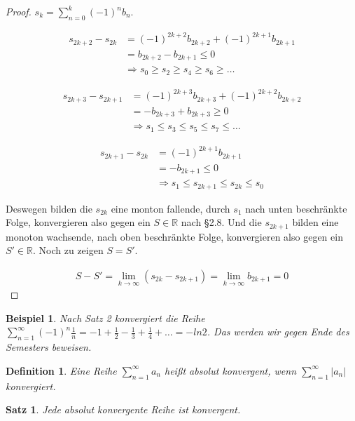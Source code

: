 \documentclass[a4paper,10pt]{article}
\newtheorem{definition}{Definition}
\newtheorem{example}{Beispiel}
\newtheorem{satz}{Satz}
\begin{document}
\begin{proof}
 $s_k = \sum_{n = 0}^k (-1)^n b_n$.
 
 \begin{align*}
  s_{2k + 2} - s_{2k} & = (-1)^{2k + 2} b_{2k + 2} + (-1)^{2k + 1} b_{2k + 1}\\
  & = b_{2k + 2} - b_{2k + 1} \le 0\\
  & \Rightarrow s_0 \ge s_2 \ge s_4 \ge s_6 \ge \dots
 \end{align*}
 
 \begin{align*}
  s_{2k + 3} - s_{2k + 1} & = (-1)^{2k + 3} b_{2k + 3} + (-1)^{2k + 2} b_{2k + 2}\\
  & = -b_{2k + 3} + b_{2k + 3} \ge 0\\
  & \Rightarrow s_1 \le s_3 \le s_5 \le s_7 \le \dots
 \end{align*}
 
 \begin{align*}
  s_{2k + 1} - s_{2k} & = (-1)^{2k + 1} b_{2k + 1}\\
  & = -b_{2k + 1} \le 0\\
  & \Rightarrow s_1 \le s_{2k + 1} \le s_{2k} \le s_0
 \end{align*}
 
 Deswegen bilden die $s_{2k}$ eine monton fallende, durch $s_1$ nach unten beschränkte Folge, konvergieren also gegen ein $S \in \mathbb{R}$ nach §2.8.
 Und die $s_{2k + 1}$ bilden eine monoton wachsende, nach oben beschränkte Folge, konvergieren also gegen ein $S' \in \mathbb{R}$.
 Noch zu zeigen $S = S'$.
 
 \begin{align*}
  S - S' = \lim_{k \rightarrow \infty} (s_{2k} - s_{2k + 1}) = \lim_{k \rightarrow \infty} b_{2k + 1} = 0
 \end{align*}
\end{proof}

\begin{example}
 Nach Satz 2 konvergiert die Reihe $\sum_{n = 1}^\infty (-1)^n \frac{1}{n} = -1 + \frac{1}{2} - \frac{1}{3} + \frac{1}{4} + \dots = -ln 2$.
 Das werden wir gegen Ende des Semesters beweisen.
\end{example}

\begin{definition}
 Eine Reihe $\sum_{n = 1}^\infty a_n$ heißt absolut konvergent, wenn $\sum_{n = 1}^\infty |a_n|$ konvergiert.
\end{definition}

\begin{satz}
 Jede absolut konvergente Reihe ist konvergent.
\end{satz}
\end{document}
